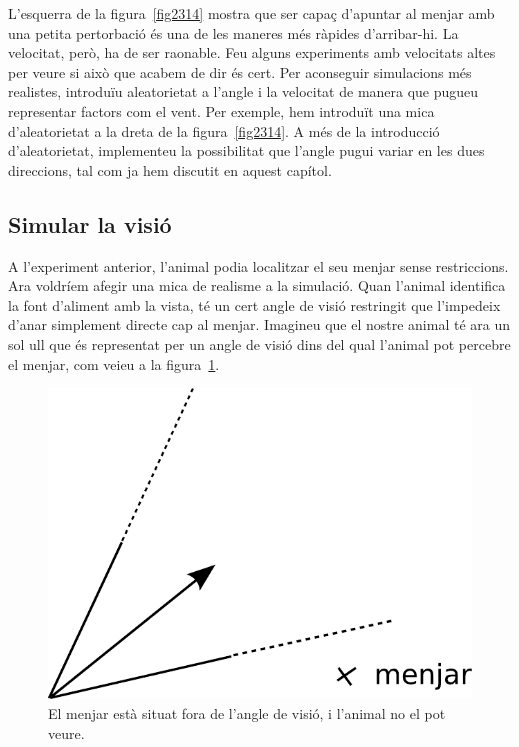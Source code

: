 L'esquerra de la figura~\ref{fig2314} mostra que ser capaç d'apuntar al menjar amb una petita pertorbació és una de les maneres més ràpides d'arribar-hi. La velocitat, però, ha de ser raonable. Feu alguns experiments amb velocitats altes per veure si això que acabem de dir és cert. Per aconseguir simulacions més realistes, introduïu aleatorietat a l'angle i la velocitat de manera que pugueu representar factors com el vent. Per exemple, hem introduït una mica d'aleatorietat a la dreta de la figura~\ref{fig2314}. A més de la introducció d'aleatorietat, implementeu la possibilitat que l'angle pugui variar en les dues direccions, tal com ja hem discutit en aquest capítol.

\subsection{Simular la visió}
A l'experiment anterior, l'animal podia localitzar el seu menjar sense restriccions. Ara voldríem afegir una mica de realisme a la simulació. Quan l'animal identifica la font d'aliment amb la vista, té un cert angle de visió restringit que l'impedeix d'anar simplement directe cap al menjar. Imagineu que el nostre animal té ara un sol ull que és representat per un angle de visió dins del qual l'animal pot percebre el menjar, com veieu a la figura~\ref{fig2315}.
\begin{figure}[h!]
\begin{center}
\includegraphics[scale=0.5]{Imatges/figura23-15}
\end{center}
\caption{El menjar està situat fora de l'angle de visió, i l'animal no el pot veure.}
\label{fig2315}
\end{figure}

